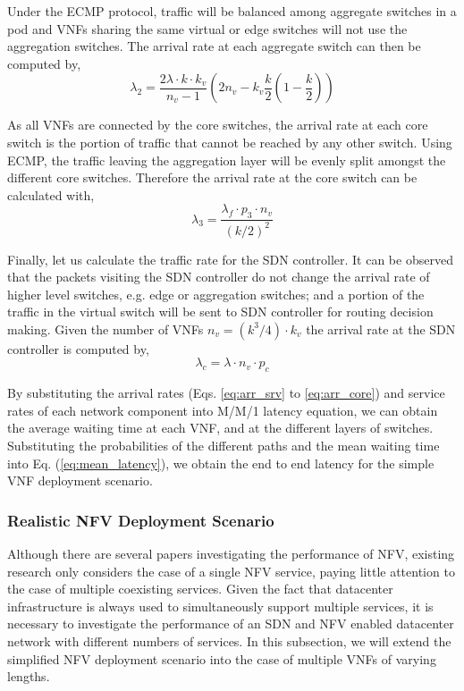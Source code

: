 Under the ECMP protocol, traffic will be balanced among aggregate switches in a pod and VNFs sharing the same virtual or edge switches will not use the aggregation switches. The arrival rate at each aggregate switch can then be computed by,
\begin{equation}
    \label{eq:arr_agg}
    \lambda_2 = \frac{2 \lambda \cdot k \cdot k_v}{n_v - 1} \left(2n_v - k_v \frac{k}{2} (1 - \frac{k}{2}) \right)
\end{equation}

As all VNFs are connected by the core switches, the arrival rate at each core switch is the portion of traffic that cannot be reached by any other switch. Using ECMP, the traffic leaving the aggregation layer will be evenly split amongst the different core switches. Therefore the arrival rate at the core switch can be calculated with,
\begin{equation}
    \label{eq:arr_core}
    \lambda_3 =\frac{\lambda_f \cdot p_3 \cdot n_v}{(k/2)^2}
\end{equation}

Finally, let us calculate the traffic rate for the SDN controller. It can be observed that the packets visiting the SDN controller do not change the arrival rate of higher level switches, e.g. edge or aggregation switches; and a portion of the traffic in the virtual switch will be sent to SDN controller for routing decision making. Given the number of VNFs $n_v = (k^3 / 4) \cdot k_v$ the arrival rate at the SDN controller is computed by,
\begin{equation}
    \label{eq:arr_sdn}
    \lambda_c = \lambda \cdot n_v \cdot p_c
\end{equation}

By substituting the arrival rates (Eqs. \ref{eq:arr_srv} to \ref{eq:arr_core}) and service rates of each network component into M/M/1 latency equation, we can obtain the average waiting time at each VNF, and at the different layers of switches. Substituting the probabilities of the different paths and the mean waiting time into Eq. (\ref{eq:mean_latency}), we obtain the end to end latency for the simple VNF deployment scenario.

\subsubsection{Realistic NFV Deployment Scenario} 
\label{sec:realistic}

Although there are several papers investigating the performance of NFV, existing research only considers the case of a single NFV service, paying little attention to the case of multiple coexisting services. Given the fact that datacenter infrastructure is always used to simultaneously support multiple services, it is necessary to investigate the performance of an SDN and NFV enabled datacenter network with different numbers of services. In this subsection, we will extend the simplified NFV deployment scenario into the case of multiple VNFs of varying lengths.

